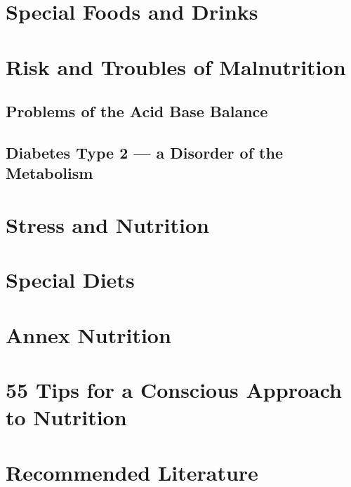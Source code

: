 \documentclass[../main.tex]{subfiles}
\begin{document}


\chapter{Special Foods and Drinks}\label{SpecialFoods} 



\chapter{Risk and Troubles of Malnutrition}

\section{Problems of the Acid Base Balance}


\section{Diabetes Type 2 --- a Disorder of the Metabolism}



\chapter{Stress and Nutrition}



\chapter{Special Diets}



\chapter{Annex Nutrition}



\chapter{55 Tips for a Conscious Approach to Nutrition}



\chapter{Recommended Literature}
\end{document}
